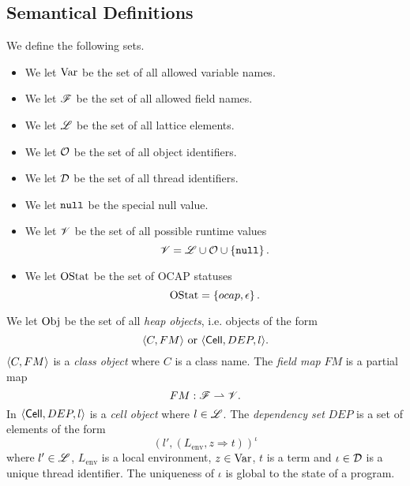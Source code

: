 \subsection{Semantical Definitions}%
\label{sub:semantical_definitions}

\begin{definition}[Sets] We define the following sets.
  \begin{itemize}
    \item We let $\mathrm{Var}$ be the set of all allowed variable names.
    \item We let $\mathscr{F}$ be the set of all allowed field names.
    \item We let $\mbox{$\mathscr{L}$}$ be the set of all lattice elements.
    \item We let $\mathcal{O}$ be the set of all object identifiers.
    \item We let $\mathcal{D}$ be the set of all thread identifiers.
    \item We let $\mbox{\mdseries\texttt{null}}$ be the special null value.
    \item We let $\mathscr{V}$ be the set of all possible runtime values
      \begin{equation*}
        \mathscr{V} = \mbox{$\mathscr{L}$} \cup \mathcal{O} \cup \left\{ \mbox{\mdseries\texttt{null}} \right\}.
      \end{equation*}
    \item We let $\mathrm{OStat}$ be the set of OCAP statuses
      \begin{equation*}
        \mathrm{OStat} = \left\{ \mbox{$ocap$}, \mbox{$\epsilon$} \right\}.
      \end{equation*}
  \end{itemize}
\end{definition}

\begin{definition}\label{def:heap_obj}
  We let $\mathrm{Obj}$ be the set of all \emph{heap objects}, i.e. objects of the
  form
  \begin{equation*}
    \mbox{$\langle C, FM \rangle$} \text{ or } \mbox{$\langle \mbox{$\mathsf{Cell}$}{}, DEP, l \rangle$}.
  \end{equation*}
  $\mbox{$\langle C, FM \rangle$}$ is a \emph{class object} where $C$ is a class name. The \emph{field
  map} $FM$ is a partial map
  \begin{equation*}
    FM: \mathscr{F} \rightharpoonup \mathscr{V}.
  \end{equation*}
  In $\mbox{$\langle \mbox{$\mathsf{Cell}$}{}, DEP, l \rangle$}$ is a \emph{cell object} where $l \in \mbox{$\mathscr{L}$}$. The
  \emph{dependency set} $DEP$ is a set of elements of the form
  \begin{equation*}
    (l' , (L_{\text{env}}, z \Rightarrow t))^\iota
  \end{equation*}
  where $l' \in \mbox{$\mathscr{L}$}$, $L_{\text{env}}$ is a local environment, $z \in
  \mathrm{Var}$, $t$ is a term and $\iota \in \mathcal{D}$ is a unique thread identifier. The
  uniqueness of $\iota$ is global to the state of a program.
\end{definition}

